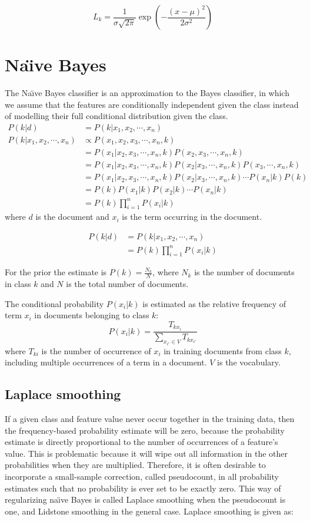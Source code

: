 \documentclass{article}
\begin{document}
\[
L_k = \frac{1}{\sigma\sqrt{2\pi}} \exp \left( -\frac{(x-\mu)^2}{2\sigma^2} \right)
\]

\section{Na\"{\i}ve Bayes}
The Na\"{\i}ve Bayes classifier is an approximation to the Bayes classifier, in which we assume that the features are conditionally independent given the class instead of modelling their full conditional distribution given the class.
\begin{align*} 
P(k|d) &= P(k|x_1,x_2,\cdots,x_n) \\
P(k|x_1,x_2,\cdots,x_n) &\propto  P(x_1,x_2,x_3,\cdots,x_n,k) \\ 
&=  P(x_1|x_2,x_3,\cdots,x_n,k)P(x_2,x_3,\cdots,x_n,k) \\ 
&= P(x_1|x_2,x_3,\cdots,x_n,k)P(x_2|x_3,\cdots,x_n,k)P(x_3,\cdots,x_n,k) \\
&=  P(x_1|x_2,x_3,\cdots,x_n,k)P(x_2|x_3,\cdots,x_n,k) \cdots P(x_n|k)P(k) \\ 
&=  P(k)P(x_1|k)P(x_2|k) \cdots P(x_n|k) \\
&=  P(k)\prod_{i=1}^{n} P(x_i|k)
\end{align*}
where $d$ is the document and $x_i$ is the term occurring in the document.

\begin{align*} 
P(k|d) &= P(k|x_1,x_2,\cdots,x_n) \\
 &= P(k)\prod_{i=1}^{n} P(x_i|k)
\end{align*}

For the prior the estimate is $P(k) = \frac{N_k}{N}$, where $N_k$ is the number of documents in class $k$ and $N$ is the total number of documents. 

The conditional probability $P(x_i|k)$ is estimated as the relative frequency of term $x_i$ in documents belonging to class $k$:
\[P(x_i|k) = \frac{T_{kx_i}}{\sum_{x_{i'} \in V} T_{kx_{i'}}}\]
where $T_{ki}$ is the number of occurrence of $x_i$ in training documents from class $k$, including multiple occurrences of a term in a document. $V$ is the vocabulary. 

\subsection{Laplace smoothing}
If a given class and feature value never occur together in the training data, then the frequency-based probability estimate will be zero, because the probability estimate is directly proportional to the number of occurrences of a feature's value. This is problematic because it will wipe out all information in the other probabilities when they are multiplied. Therefore, it is often desirable to incorporate a small-sample correction, called pseudocount, in all probability estimates such that no probability is ever set to be exactly zero. This way of regularizing na\"{\i}ve Bayes is called Laplace smoothing when the pseudocount is one, and Lidstone smoothing in the general case. Laplace smoothing is given as:
\end{document}
